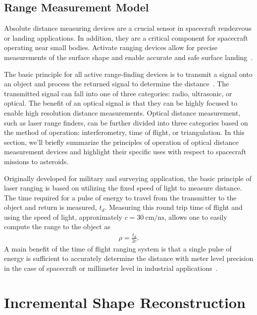 \documentclass[letterpaper, paper,11pt]{AAS}		%
\begin{document}
\subsection{Range Measurement Model}

Absolute distance measuring devices are a crucial sensor in spacecraft rendezvous or landing applications.
In addition, they are a critical component for spacecraft operating near small bodies.
Activate ranging devices allow for precise measurements of the surface shape and enable accurate and safe surface landing~\cite{berry2013}.

The basic principle for all active range-finding devices is to transmit a signal onto an object and process the returned signal to determine the distance~\cite{amann2001}.
The transmitted signal can fall into one of three categories: radio, ultrasonic, or optical.
The benefit of an optical signal is that they can be highly focused to enable high resolution distance measurements.
Optical distance measurement, such as laser range finders, can be further divided into three categories based on the method of operation: interferometry, time of flight, or triangulation.
In this section, we'll briefly summarize the principles of operation of optical distance measurement devices and highlight their specific uses with respect to spacecraft missions to asteroids.

Originally developed for military and surveying application, the basic principle of laser ranging is based on utilizing the fixed speed of light to measure distance.
The time required for a pulse of energy to travel from the transmitter to the object and return is measured, \( t_d \). 
Measuring this round trip time of flight and using the speed of light, approximately \( c = \SI{30}{\centi\meter\per\nano\second}\), allows one to easily compute the range to the object as
\begin{align}
    \rho = \frac{t_d}{2 c}. 
\end{align}
A main benefit of the time of flight ranging system is that a single pulse of energy is sufficient to accurately determine the distance with meter level precision in the case of spacecraft or millimeter level in industrial applications~\cite{zuber1997,cole1998,amann2001}.

\section{Incremental Shape Reconstruction}\label{sec:radius_update}
\end{document}
